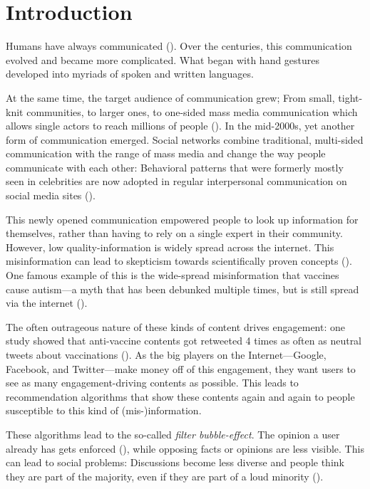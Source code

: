 \section{Introduction}
Humans have always communicated (\cite{tomasello2010origins}). Over the centuries, this communication evolved and became more complicated. What began with hand gestures developed into myriads of spoken and written languages.

At the same time, the target audience of communication grew; From small, tight-knit communities, to larger ones, to one-sided mass media communication which allows single actors to reach millions of people (\cite{luhmann1995realitat}). In the mid-2000s, yet another form of communication emerged. Social networks combine traditional, multi-sided communication with the range of mass media and change the way people communicate with each other: Behavioral patterns that were formerly mostly seen in celebrities are now adopted in regular interpersonal communication on social media sites (\cite{stefanoneRelationshipTraditionalMass2010}).

This newly opened communication empowered people to look up information for themselves, rather than having to rely on a single expert in their community. However, low quality-information is widely spread across the internet. This misinformation can lead to skepticism towards scientifically proven concepts (\cite{krimskyRiskCommunicationInternet2007}). One famous example of this is the wide-spread misinformation that vaccines cause autism---a myth that has been debunked multiple times, but is still spread via the internet (\cite{baker2008mercury}).

The often outrageous nature of these kinds of content drives engagement: one study showed that anti-vaccine contents got retweeted 4 times as often as neutral tweets about vaccinations (\cite{blankenshipSentimentContentsRetweets2018}). As the big players on the Internet---Google, Facebook, and Twitter---make money off of this engagement, they want users to see as many engagement-driving contents as possible. This leads to recommendation algorithms that show these contents again and again to people susceptible to this kind of (mis-)information.

These algorithms lead to the so-called \emph{filter bubble-effect}. The opinion a user already has gets enforced (\cite{pariser2011filter}), while opposing facts or opinions are less visible. This can lead to social problems: Discussions become less diverse and people think they are part of the majority, even if they are part of a loud minority (\cite{moscoviciSilentMajoritiesLoud1991}).

